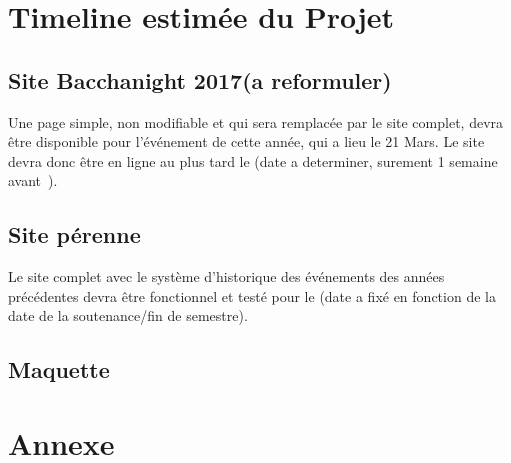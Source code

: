 \documentclass[12pt]{article}
\begin{document}
\section{Timeline estimée du Projet}

\subsection*{Site Bacchanight 2017(a reformuler)}
  Une page simple, non modifiable et qui sera remplacée par le site complet, devra être disponible pour l'événement de cette année, qui a lieu le 21 Mars. Le site devra donc être en ligne au plus tard le (date a determiner, surement 1 semaine avant~).

\subsection*{Site pérenne}
  Le site complet avec le système d'historique des événements des années précédentes devra être fonctionnel et testé pour le (date a fixé en fonction de la date de la soutenance/fin de semestre).
\newpage

\subsection*{Maquette}


\section{Annexe}
\end{document}
